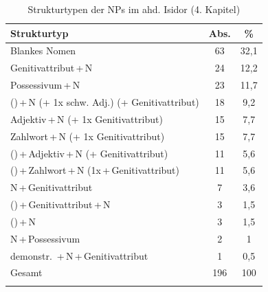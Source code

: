 \begin{table}
\centering
\caption{Strukturtypen der NPs im ahd. Isidor (4. Kapitel) \parencite{Flick2018}}
\label{NP-Flick}
\begin{tabular}{lS[table-format=2.0]S[table-format=2.1]}
\lsptoprule
{Strukturtyp}                                   & {Abs.} & {\%}  \\ \midrule
Blankes Nomen                                          & 63            & 32,1         \\
Genitivattribut\,+\,N                                    & 24            & 12,2         \\
Possessivum\,+\,N                                          & 23            & 11,7         \\
 ()\,+\,N (+ 1x schw. Adj.) (+ Genitivattribut) & 18            & 9,2          \\
Adjektiv\,+\,N (+ 1x Genitivattribut)                    & 15            & 7,7          \\
Zahlwort\,+\,N (+ 1x Genitivattribut)                    & 15            & 7,7          \\
 ()\,+\,Adjektiv\,+\,N (+ Genitivattribut)        & 11            & 5,6          \\
 ()\,+\,Zahlwort\,+\,N (1x\,+\,Genitivattribut)     & 11            & 5,6          \\
N\,+\,Genitivattribut                                    & 7             & 3,6          \\
 ()\,+\,Genitivattribut\,+\,N                     & 3             & 1,5          \\
 ()\,+\,N                                     & 3             & 1,5          \\
N\,+\,Possessivum                                          & 2             & 1            \\
demonstr. \,+\,N\,+\,Genitivattribut                   & 1             & 0,5          \\\midrule
{Gesamt}                                        & {196}  & {100} \\ \lspbottomrule
\end{tabular}
\end{table}


